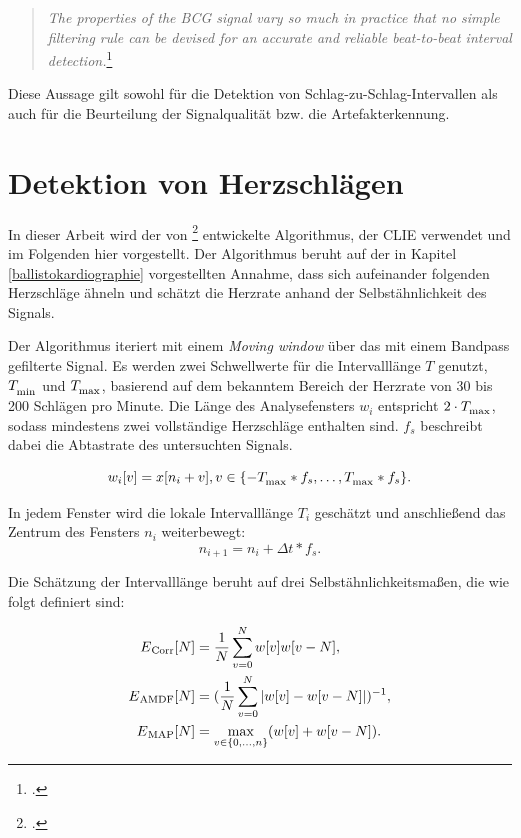 	\begin{quote}\textit{The properties of the BCG signal vary so much in practice that no simple filtering rule can be devised for an accurate and reliable beat-to-beat interval detection.}\footcite{Paalasmaa2015}\end{quote}
	
	Diese Aussage gilt sowohl für die Detektion von Schlag-zu-Schlag-Intervallen als auch für die Beurteilung der Signalqualität bzw. die Artefakterkennung.

\section{Detektion von Herzschlägen}\label{CLIE}

	In dieser Arbeit wird der von \citeauthor{Bruser2013}\footcite{Bruser2013} entwickelte Algorithmus, der \acf{CLIE} verwendet und im Folgenden hier vorgestellt. Der Algorithmus beruht auf der in Kapitel \ref{ballistokardiographie} vorgestellten Annahme, dass sich aufeinander folgenden Herzschläge ähneln und schätzt die Herzrate anhand der Selbstähnlichkeit des Signals.


	Der Algorithmus iteriert mit einem \textit{Moving window} über das mit einem Bandpass gefilterte Signal. Es werden zwei Schwellwerte für die Intervalllänge $T$ genutzt, $T_\textsubscript{min}$ und $T_\textsubscript{max}$, basierend auf dem bekanntem Bereich der Herzrate von 30 bis 200 Schlägen pro Minute. Die Länge des Analysefensters $w_i$ entspricht $2 \cdot T_\textsubscript{max}$, sodass mindestens zwei vollständige Herzschläge enthalten sind. $f_s$ beschreibt dabei die Abtastrate des untersuchten Signals.
	
	\[ %
		w_i[v] = x[n_i + v], v \in \{ -T_\textsubscript{max} * f_s, \ldots, T_\textsubscript{max} * f_s\}\text{.}
	\]
	
	In jedem Fenster wird die lokale Intervalllänge $T_i$ geschätzt und anschließend das Zentrum des Fensters $n_i$ weiterbewegt: \[ n_{i+1} = n_i + \Delta t * f_s\text{.} \]
	
	Die Schätzung der Intervalllänge beruht auf drei Selbstähnlichkeitsmaßen, die wie folgt definiert sind:
	
	\begin{align*}
		E\textsubscript{Corr}[N] &= \frac{1}{N} \sum_{v=0}^{N} w[v]w[v-N],\\
		E\textsubscript{AMDF}[N] &= (\frac{1}{N} \sum_{v=0}^{N} |w[v]-w[v-N]|)^{-1},\\
		E\textsubscript{MAP}[N] &= \max_{v \in \{0,...,n\}}(w[v]+w[v-N]).
	\end{align*}
 	
